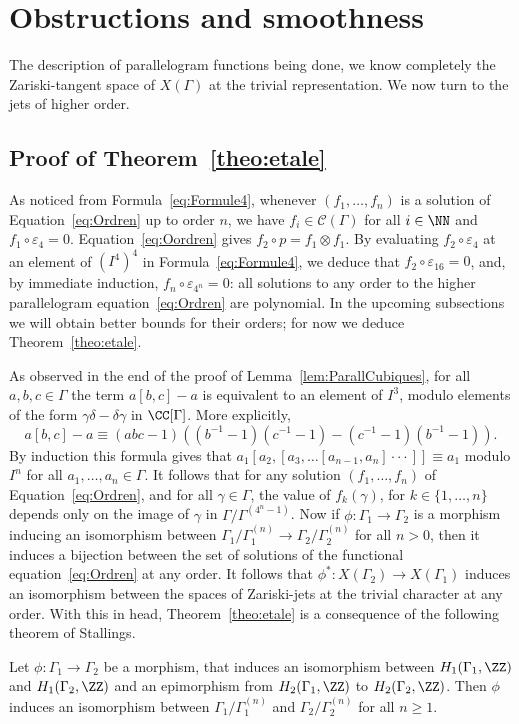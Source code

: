 \section{Obstructions and smoothness}

The description of parallelogram functions being done, we know completely
the Zariski-tangent space of $X(\Gamma)$ at the trivial representation.
We now turn to the jets of higher order.

\subsection{Proof of Theorem~\ref{theo:etale}}
As noticed from Formula~\eqref{eq:Formule4}, whenever $(f_1,\ldots,f_n)$
is a solution of Equation~\eqref{eq:Ordren} up to order $n$, we have
$f_i\in \mathcal{C}(\Gamma)$ for all $i\in\NN$ and $f_1\circ\varepsilon_4=0$.
Equation~\eqref{eq:Oordren} gives $f_2\circ p= f_1\otimes f_1$.
By evaluating $f_2\circ\varepsilon_4$ at
an element of $(I^4)^4$ in Formula~\eqref{eq:Formule4},
we deduce that $f_2\circ\varepsilon_{16}=0$, and,
by immediate induction, $f_n\circ\varepsilon_{4^n}=0$: all solutions to
any order to the higher parallelogram equation~\eqref{eq:Ordren} are
polynomial. In the upcoming subsections we will obtain better bounds for
their orders; for now we deduce Theorem~\ref{theo:etale}.

As observed in the end of the proof of Lemma~\ref{lem:ParallCubiques},
for all
$a,b,c\in\Gamma$ the term $a[b,c]-a$ is equivalent to an element of $I^3$,
modulo elements of the form $\gamma\delta-\delta\gamma$ in $\CC[\Gamma]$.
More explicitly,
\[ a[b,c] - a \equiv
(abc-1)\left((b^{-1}-1)(c^{-1}-1)-(c^{-1}-1)(b^{-1}-1)\right). \]
By induction this formula gives that $a_1[a_2,[a_3,\dots[a_{n-1},a_n]\cdot\cdot\cdot]]\equiv a_1$ modulo $I^n$ for all $a_1,\ldots,a_n\in\Gamma$. It follows that for any solution $(f_1,\ldots,f_n)$ of
Equation~\eqref{eq:Ordren}, and for all $\gamma\in\Gamma$, the value of
$f_k(\gamma)$, for $k\in\{1,\ldots,n\}$ depends only on the image of
$\gamma$ in $\Gamma/\Gamma^{(4^n-1)}$. Now if
$\phi\colon\Gamma_1\to\Gamma_2$ is a morphism inducing an isomorphism
between $\Gamma_1/\Gamma_1^{(n)}\to \Gamma_2/\Gamma_2^{(n)}$ for all $n>0$,
then it induces a bijection between the set of solutions of the functional
equation~\eqref{eq:Ordren} at any order. It follows that
$\phi^*:X(\Gamma_2)\to X(\Gamma_1)$ induces an isomorphism between the
spaces of Zariski-jets at the trivial character at any order. With this in
head, Theorem~\ref{theo:etale} is a consequence of the following theorem of Stallings.
\begin{theorem}
Let $\phi\colon \Gamma_1\to \Gamma_2$ be a morphism, that induces an
isomorphism between $H_1(\Gamma_1,\ZZ)$ and $H_1(\Gamma_2,\ZZ)$ and an
epimorphism from $H_2(\Gamma_1,\ZZ)$ to $H_2(\Gamma_2,\ZZ)$.
Then $\phi$ induces an isomorphism between
$\Gamma_1/\Gamma_1^{(n)}$ and $\Gamma_2/\Gamma_2^{(n)}$ for all
$n\geq 1$.
\end{theorem}

